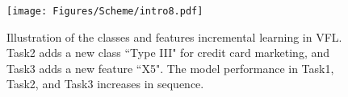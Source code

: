 % 
\begin{figure}
    \centering
    \texttt{[image: Figures/Scheme/intro8.pdf]}
    \caption{Illustration of the classes and features incremental learning in VFL. Task2 adds a new class ``Type III" for credit card marketing, and Task3 adds a new feature ``X5". The model performance in Task1, Task2, and Task3 increases in sequence. 
    }
    \label{fig: intro}
\end{figure}

